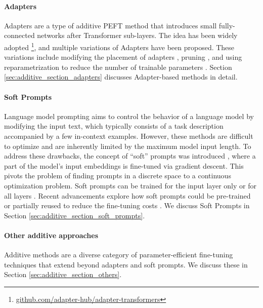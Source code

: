 \paragraph{Adapters}
Adapters \citep{adapters} are a type of additive PEFT method that introduces small fully-connected networks after Transformer sub-layers. The idea has been widely adopted \citep{adapterhub} \footnote{\href{https://github.com/adapter-hub/adapter-transformers}{github.com/adapter-hub/adapter-transformers}}, and multiple variations of Adapters have been proposed. These variations include modifying the placement of adapters \citep{parallel_adapter,parallel_adapter2}, pruning \citep{sparse_adapter}, and using reparametrization to reduce the number of trainable parameters \citep{compacter}. Section \ref{sec:additive_section_adapters} discusses Adapter-based methods in detail.

\paragraph{Soft Prompts}

Language model prompting \citep{radford2019language} aims to control the behavior of a language model by modifying the input text, which typically consists of a task description accompanied by a few in-context examples. However, these methods are difficult to optimize and are inherently limited by the maximum model input length. To address these drawbacks, the concept of ``soft'' prompts was introduced \citep{p_tuning,prompt_tuning,prefix_tuning}, where a part of the model's input embeddings is fine-tuned via gradient descent. This pivots the problem of finding prompts in a discrete space to a continuous optimization problem. Soft prompts can be trained for the input layer only \citep{p_tuning,prompt_tuning} or for all layers \citep{prefix_tuning}. Recent advancements explore how soft prompts could be pre-trained or partially reused to reduce the fine-tuning costs \citep{spot,Hambardzumyan2021WARPWA,prompt_mapping,ipt}. We discuss Soft Prompts in Section \ref{sec:additive_section_soft_prompts}.

\paragraph{Other additive approaches} Additive methods are a diverse category of parameter-efficient fine-tuning techniques that extend beyond adapters and soft prompts. We discuss these in Section \ref{sec:additive_section_others}.

